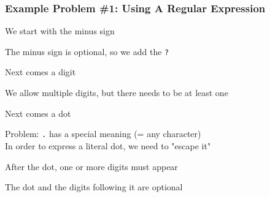 \begin{frame}
  \frametitle{Example Problem \#1: Using A Regular Expression}
  \begin{center}\ttfamily
  \end{center}
  \vskip5mm
  \vskip2mm
  \begin{overprint}
    \begin{center}
      We start with the minus sign
    \end{center}
    \begin{center}
      The minus sign is optional, so we add the \texttt{?}
    \end{center}
    \begin{center}
      Next comes a digit
    \end{center}
    \begin{center}
      We allow multiple digits, but there needs to be at least one
    \end{center}
    \begin{center}
      Next comes a dot
    \end{center}
    \begin{center}
      Problem: \texttt{.} has a special meaning (= any character) \\
      In order to express a literal dot, we need to "escape it"
    \end{center}
    \begin{center}
      After the dot, one or more digits must appear
    \end{center}
    \begin{center}
      The dot and the digits following it are optional
    \end{center}
  \end{overprint}
\end{frame}


